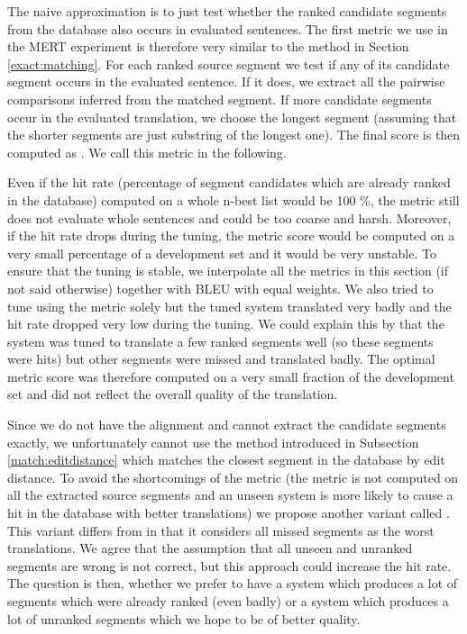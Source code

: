 The naive approximation is to just test whether the ranked candidate segments
from the database also occurs in evaluated sentences. The first metric we use
in the MERT experiment is therefore very similar to the 
method in Section \ref{exact:matching}. For each ranked source segment we
test if any of its candidate segment occurs in the evaluated sentence. If it
does, we extract all the pairwise comparisons inferred from the matched segment. If
more candidate segments occur in the evaluated translation, we choose the
longest segment (assuming that the shorter segments are just substring of the
longest one). The final score is then computed as . We call this metric  in the following.

Even if the hit rate (percentage of segment candidates which are already ranked
in the database) computed on a whole n-best list would be 100 \%, the
 metric still does not evaluate whole sentences and could be
too coarse and harsh. Moreover, if the hit rate drops during the tuning, the
metric score would be computed on a very small percentage of a development set
and it would be very unstable. To ensure that the tuning is stable, we interpolate all
the metrics in this section (if not said otherwise) together with BLEU with
equal weights. We also tried to tune using the  metric
solely but the tuned system translated very badly and the hit rate dropped very
low during the tuning. We could explain this by that the system was tuned to
translate a few ranked segments well (so these segments were hits) but other
segments were missed and translated badly. The optimal metric score was
therefore computed on a very small fraction of the development set and did not
reflect the overall quality of the translation.

Since we do not have the alignment and cannot extract the candidate segments
exactly, we unfortunately cannot use the method introduced in Subsection
\ref{match:editdistance} which matches the closest segment in the database by
edit distance.  To avoid the shortcomings of the  metric
(the metric is not computed on all the extracted source segments and an unseen
system is more likely to cause a hit in the database with better translations) we
propose another variant called . This variant differs
from  in that it considers all missed segments as the worst
translations. We agree that the assumption that all unseen and unranked
segments are wrong is not correct, but this approach could increase the hit
rate. The question is then, whether we prefer to have a system which produces a
lot of segments which were already ranked (even badly) or a system which
produces a lot of unranked segments which we hope to be of better quality.

